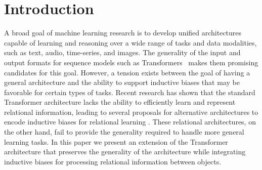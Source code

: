 \section{Introduction}\label{sec:intro}

A broad goal of machine learning research is to develop unified architectures capable of learning and reasoning over a wide range of tasks and data modalities, such as text, audio, time-series, and images. The generality of the input and output formats for sequence models such as Transformers~\citep{vaswani2017attention} makes them promising candidates for this goal. However, a tension exists between the goal of having a general architecture and the ability to support inductive biases that may be favorable for certain types of tasks. Recent research has shown that the standard Transformer architecture lacks the ability to efficiently learn and represent relational information, leading to several proposals for alternative architectures to encode inductive biases for relational learning \citep{santoroSimpleNeuralNetwork2017,santoroRelationalRecurrentNeural2018,shanahanExplicitlyRelationalNeurala,webbEmergentSymbolsBinding2021,webbRelationalBottleneckInductive2024,kergNeuralArchitectureInductive2022,altabaa2024abstractors,altabaaLearningHierarchicalRelational2024}. These relational architectures, on the other hand, fail to provide the generality required to handle more general learning tasks. In this paper we present an extension of the Transformer architecture that preserves the generality of the architecture while integrating inductive biases for processing relational information between objects.


